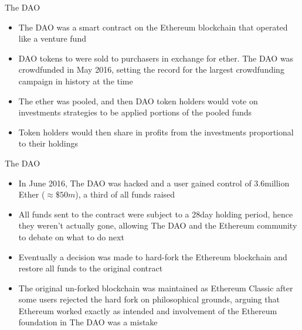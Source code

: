 \documentclass[9pt]{beamer}
\begin{document}

\begin{frame}{The DAO}
	\begin{itemize}
		\item The DAO was a smart contract on the Ethereum blockchain that operated like a venture fund
		\item DAO tokens to were sold to purchasers in exchange for ether. The DAO was crowdfunded in May 2016, setting the record for the largest crowdfunding campaign in history at the time
		\item The ether was pooled, and then DAO token holders would vote on investments strategies to be applied portions of the pooled funds
		\item Token holders would then share in profits from the investments proportional to their holdings
	\end{itemize}
\end{frame}


\begin{frame}{The DAO}
	\begin{itemize}
		\item In June 2016, The DAO was hacked and a user gained control of 3.6million Ether ($\approx\$50m$), a third of all funds raised
		\item All funds sent to the contract were subject to a 28day holding period, hence they weren't actually gone, allowing The DAO and the Ethereum community to debate on what to do next
		\item Eventually a decision was made to hard-fork the Ethereum blockchain and restore all funds to the original contract
		\item The original un-forked blockchain was maintained as Ethereum Classic after some users rejected the hard fork on philosophical grounds, arguing that Ethereum worked exactly as intended and  involvement of the Ethereum foundation in The DAO was a mistake
	\end{itemize}
\end{frame}

\end{document}
